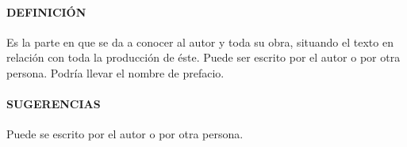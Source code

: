 \paragraph{DEFINICIÓN}
Es la parte en que se da a conocer al autor y toda su obra, situando el texto en relación con toda la producción de éste. Puede ser escrito por el autor o por otra persona. Podría llevar el nombre de prefacio.

\paragraph{SUGERENCIAS}
Puede se escrito por el autor o por otra persona.